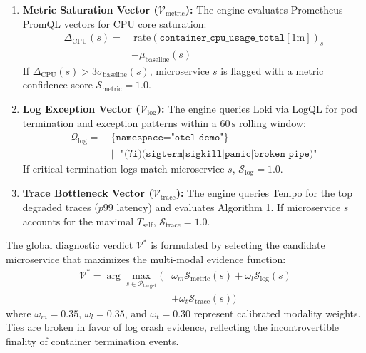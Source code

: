 \begin{enumerate}[leftmargin=1.2em, itemsep=2pt, topsep=3pt]
    \item \textbf{Metric Saturation Vector ($\mathcal{V}_{\text{metric}}$):} The engine evaluates Prometheus PromQL vectors for CPU core saturation:
    \begin{equation}
    \begin{split}
        \Delta_{\text{CPU}}(s) = &\ \text{rate}(\texttt{container\_cpu\_usage\_total}[1\text{m}])_s \\
        &- \mu_{\text{baseline}}(s)
    \end{split}
    \end{equation}
    If $\Delta_{\text{CPU}}(s) > 3\sigma_{\text{baseline}}(s)$, microservice $s$ is flagged with a metric confidence score $\mathcal{S}_{\text{metric}} = 1.0$.
    \item \textbf{Log Exception Vector ($\mathcal{V}_{\text{log}}$):} The engine queries Loki via LogQL for pod termination and exception patterns within a $60\,\text{s}$ rolling window:
    \begin{equation}
    \begin{split}
        \mathcal{Q}_{\text{log}} = &\ \texttt{\{namespace="otel-demo"\}} \\
        &\ \texttt{|~ "(?i)(sigterm|sigkill|panic|broken pipe)"}
    \end{split}
    \end{equation}
    If critical termination logs match microservice $s$, $\mathcal{S}_{\text{log}} = 1.0$.
    \item \textbf{Trace Bottleneck Vector ($\mathcal{V}_{\text{trace}}$):} The engine queries Tempo for the top degraded traces ($p99$ latency) and evaluates Algorithm 1. If microservice $s$ accounts for the maximal $T_{\text{self}}$, $\mathcal{S}_{\text{trace}} = 1.0$.
\end{enumerate}

The global diagnostic verdict $\mathcal{V}^*$ is formulated by selecting the candidate microservice that maximizes the multi-modal evidence function:
\begin{equation}
\begin{split}
    \mathcal{V}^* = \arg\max_{s \in \mathcal{P}_{\text{target}}} \Big( & \omega_m \mathcal{S}_{\text{metric}}(s) + \omega_l \mathcal{S}_{\text{log}}(s) \\
    & + \omega_t \mathcal{S}_{\text{trace}}(s) \Big)
\end{split}
\end{equation}
where $\omega_m = 0.35$, $\omega_l = 0.35$, and $\omega_t = 0.30$ represent calibrated modality weights. Ties are broken in favor of log crash evidence, reflecting the incontrovertible finality of container termination events.
